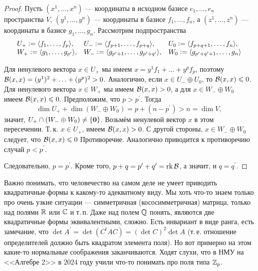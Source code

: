 \begin{proof}
    Пусть $(x^1, \ldots, x^n)$ --- координаты в исходном базисе $e_1, \ldots, e_n$ пространства $V$, $(y^1, \ldots, y^n)$ --- координаты в базисе $f_1, \ldots, f_n$, а $(z^1, \ldots, z^n)$ --- координаты в базисе $g_1, \ldots, g_n$. Рассмотрим подпространства
    \[
        \begin{array}{l l l}
            U_+ \vcentcolon = \langle f_1, \ldots, f_p \rangle, & U_- \vcentcolon = \langle f_{p + 1}, \ldots, f_{p + q} \rangle, & U_0 \vcentcolon = \langle f_{p + q + 1}, \ldots, f_n \rangle,\\
            W_+ \vcentcolon = \langle g_1, \ldots, g_{p^\prime} \rangle, & W_- \vcentcolon = \langle g_{p^\prime + 1}, \ldots, g_{p^\prime + q^\prime} \rangle, & W_0 \vcentcolon = \langle g_{p^\prime + q^\prime + 1}, \ldots, g_n \rangle
        \end{array}
    \]

    Для ненулевого вектора $x \in U_+$ мы имеем $x = y^1f_1 + \ldots + y^pf_p$, поэтому $\mathcal{B}(x, x) = (y^1)^2 + \ldots + (y^p)^2 > 0$. Аналогично, если $x \in U_- \oplus U_0$, то $\mathcal{B}(x, x) \leqslant 0$. Для ненулевого вектора $x \in W_+$ мы имеем $\mathcal{B}(x, x) > 0$, а для $x \in W_- \oplus W_0$ имеем $\mathcal{B}(x, x) \leqslant 0$. Предположим, что $p > p^\prime$. Тогда
    \[
        \dim U_+ + \dim(W_- \oplus W_0) = p + (n - p^\prime) > n = \dim V,
    \]
    значит, $U_+ \cap (W_- \oplus W_0) \ne \{\boldsymbol{0}\}$. Возьмём ненулевой вектор $x$ в этом пересечении. Т.\,к. $x \in U_+$, имеем $\mathcal{B}(x, x) > 0$. С другой стороны, $x \in W_- \oplus W_0$ следует, что $\mathcal{B}(x, x) \leqslant 0$ Противоречие. Аналогично приводится к противоречию случай $p < p^\prime$.

    Следовательно, $p = p^\prime$. Кроме того, $p + q = p^\prime + q^\prime = \operatorname{rk}\mathcal{B}$, а значит, и $q = q^\prime$.
\end{proof}

\begin{remark}
    Важно понимать, что человечество на самом деле не умеет приводить квадратичные формы к какому-то адекватному виду. Мы хоть что-то знаем только про очень узкие ситуации --- симметричная (кососимметричная) матрица, только над полями $\mathbb{R}$ или $\mathbb{C}$ и т.\,п. Даже над полем $\mathbb{Q}$ понять, являются две квадратичные формы эквивалентными, сложно. Есть инвариант в виде ранга, есть замечание, что $\det A^\prime = \det (C^tAC) = (\det C)^2\det A$ (т.\,е. отношение определителей должно быть квадратом элемента поля). Но вот примерно на этом какие-то нормальные соображения заканчиваются. Ходят слухи, что в НМУ на <<Алгебре 2>> в 2024 году учили что-то понимать про поля типа $\mathbb{Z}_p$.
\end{remark}

